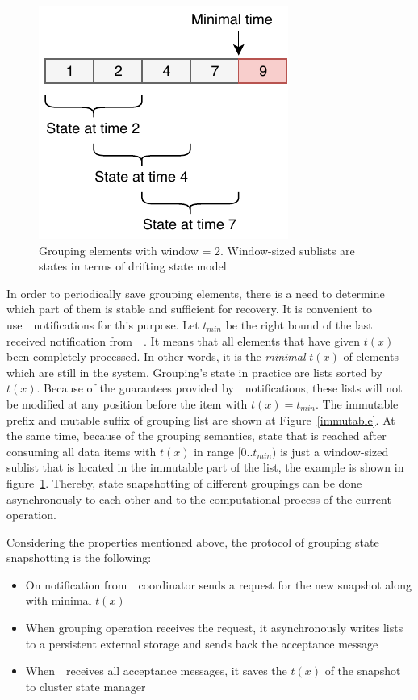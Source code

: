 \begin{figure}[htbp]
  \centering
  \includegraphics[width=0.5\columnwidth]{pics/substate}
  \caption{Grouping elements with window = 2. Window-sized sublists are states in terms of drifting state model}
  \label {substate}
\end{figure}

In order to periodically save grouping elements, there is a need to determine which part of them is stable and sufficient for recovery. It is convenient to use~\Acker\ notifications for this purpose. Let $t_{min}$ be the right bound of the last received notification from~\Acker\ . It means that all elements that have given $t(x)$ been completely processed. In other words, it is the {\em minimal} $t(x)$ of elements which are still in the system.  
Grouping's state in practice are lists sorted by $t(x)$. Because of the guarantees provided by~\Acker\ notifications, these lists will not be modified at any position before the item with $t(x)=t_{min}$. The immutable prefix and mutable suffix of grouping list are shown at Figure~\ref{immutable}. At the same time, because of the grouping semantics, state that is reached after consuming all data items with $t(x)$ in range $[0..t_{min})$ is just a window-sized sublist that is located in the immutable part of the list, the example is shown in figure~\ref{substate}. Thereby, state snapshotting of different groupings can be done asynchronously to each other and to the computational process of the current operation. 

Considering the properties mentioned above, the protocol of grouping state snapshotting is the following:

\begin{itemize}
    \item On notification from~\Acker\, coordinator sends a request for the new snapshot along with minimal $t(x)$
    \item When grouping operation receives the request, it asynchronously writes lists to a persistent external storage and sends back the acceptance message
    \item When~\Acker\ receives all acceptance messages, it saves the $t(x)$ of the snapshot to cluster state manager
\end{itemize}

